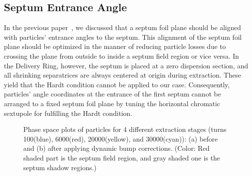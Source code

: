 \documentclass[aps,prstab,onecolumn,preprint,endfloats,11pt]{revtex4-1}
\begin{document}
\subsection{\label{sec:bump0}Septum Entrance Angle}

In the previous paper~\cite{mu2e}, we discussed that a septum foil plane should be aligned with particles' entrance angles to the septum. This alignment of the septum foil plane should be optimized in the manner of reducing particle losses due to crossing the plane from outside to inside a septum field region or vice versa. In the Delivery Ring, however, the septum is placed at a zero dispersion section, and all shrinking separatrices are always centered at origin during extraction. These yield that the Hardt condition cannot be applied to our case. Consequently, particles' angle coordinates at the entrance of the first septum cannot be arranged to a fixed septum foil plane by tuning the horizontal chromatic sextupole for fulfilling the Hardt condition.

\begin{figure}[!hbtp]
  \caption{\label{fig:bump0}Phase space plots of particles for 4 different extraction stages (turns 100(blue), 6000(red), 20000(yellow), and 30000(cyan)): (a) before and (b) after applying dynamic bump corrections. (Color: Red shaded part is the septum field region, and gray shaded one is the septum shadow regions.)}
\end{figure}
\end{document}

